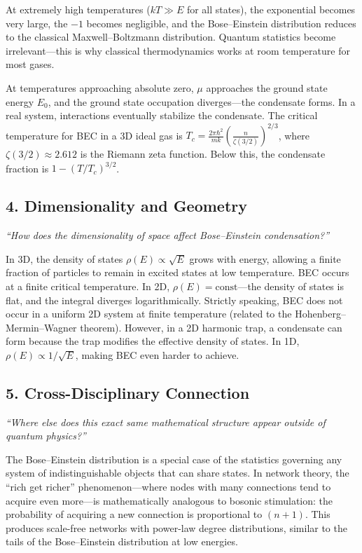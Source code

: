 \documentclass[11pt,openright]{book}
\begin{document}
At extremely high temperatures ($kT \gg E$ for all states), the exponential becomes very large, the $-1$ becomes negligible, and the Bose--Einstein distribution reduces to the classical Maxwell--Boltzmann distribution. Quantum statistics become irrelevant---this is why classical thermodynamics works at room temperature for most gases.

At temperatures approaching absolute zero, $\mu$ approaches the ground state energy $E_0$, and the ground state occupation diverges---the condensate forms. In a real system, interactions eventually stabilize the condensate. The critical temperature for BEC in a 3D ideal gas is $T_c = \frac{2\pi\hbar^2}{mk}\left(\frac{n}{\zeta(3/2)}\right)^{2/3}$, where $\zeta(3/2) \approx 2.612$ is the Riemann zeta function. Below this, the condensate fraction is $1 - (T/T_c)^{3/2}$.

\subsection*{4. Dimensionality and Geometry}
\textit{``How does the dimensionality of space affect Bose--Einstein condensation?''}

In 3D, the density of states $\rho(E) \propto \sqrt{E}$ grows with energy, allowing a finite fraction of particles to remain in excited states at low temperature. BEC occurs at a finite critical temperature. In 2D, $\rho(E) = \text{const}$---the density of states is flat, and the integral diverges logarithmically. Strictly speaking, BEC does not occur in a uniform 2D system at finite temperature (related to the Hohenberg--Mermin--Wagner theorem). However, in a 2D harmonic trap, a condensate can form because the trap modifies the effective density of states. In 1D, $\rho(E) \propto 1/\sqrt{E}$, making BEC even harder to achieve.

\subsection*{5. Cross-Disciplinary Connection}
\textit{``Where else does this exact same mathematical structure appear outside of quantum physics?''}

The Bose--Einstein distribution is a special case of the statistics governing any system of indistinguishable objects that can share states. In network theory, the ``rich get richer'' phenomenon---where nodes with many connections tend to acquire even more---is mathematically analogous to bosonic stimulation: the probability of acquiring a new connection is proportional to $(n + 1)$. This produces scale-free networks with power-law degree distributions, similar to the tails of the Bose--Einstein distribution at low energies.
\end{document}
